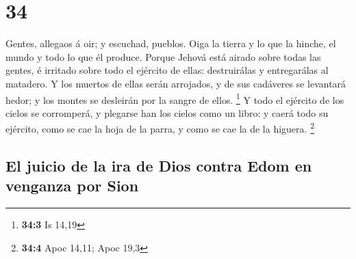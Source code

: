 \hypertarget{section-33}{%
\section{34}\label{section-33}}

 Gentes, allegaos á oir; y escuchad, pueblos. Oiga la
tierra y lo que la hinche, el mundo y todo lo que él produce.
 Porque Jehová está airado sobre todas las gentes, é
irritado sobre todo el ejército de ellas: destruirálas y entregarálas al
matadero.  Y los muertos de ellas serán arrojados, y de
sus cadáveres se levantará hedor; y los montes se desleirán por la
sangre de ellos. \footnote{\textbf{34:3} Is 14,19}  Y todo
el ejército de los cielos se corromperá, y plegarse han los cielos como
un libro: y caerá todo su ejército, como se cae la hoja de la parra, y
como se cae la de la higuera. \footnote{\textbf{34:4} Apoc 14,11; Apoc
  19,3}

\hypertarget{el-juicio-de-la-ira-de-dios-contra-edom-en-venganza-por-sion}{%
\subsection{El juicio de la ira de Dios contra Edom en venganza por
Sion}\label{el-juicio-de-la-ira-de-dios-contra-edom-en-venganza-por-sion}}

